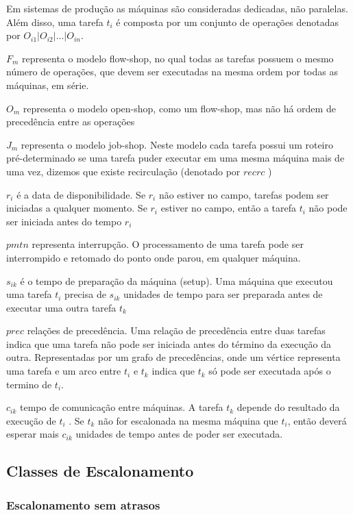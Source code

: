Em sistemas de produção as máquinas são consideradas dedicadas, não paralelas. Além disso, uma tarefa $t_i$ é composta por um conjunto de operações denotadas por $O_{i1} | O_{i2} | ... | O_{in}$.

$F_m$ representa o modelo flow-shop, no qual todas as tarefas possuem o mesmo
número de operações, que devem ser executadas na mesma ordem por todas as máquinas, em série.

$O_m$ representa o modelo open-shop, como um flow-shop, mas não há ordem
de precedência entre as operações

$J_m$  representa o modelo  job-shop. Neste modelo cada tarefa possui um roteiro pré-determinado se uma tarefa puder executar em uma mesma máquina mais de uma vez, dizemos que existe recirculação (denotado por $recrc$ ) 

$r_i$ é a data de disponibilidade. Se $r_i$ não estiver no campo, tarefas podem ser iniciadas a qualquer momento. Se $r_i$ estiver no campo, então a tarefa $t_i$ não pode ser iniciada antes do tempo $r_i$ 

$pmtn$ representa interrupção. O processamento de uma tarefa pode ser interrompido e retomado do ponto onde parou, em qualquer máquina.

$s_{ik}$ é o tempo de preparação da máquina (setup). Uma máquina que executou uma tarefa $t_i$ precisa de $s_{ik}$ unidades de tempo para ser preparada antes de executar uma outra tarefa $t_k$

$prec$ relações de precedência. Uma relação de precedência entre duas tarefas indica
que uma tarefa não pode ser iniciada antes do término da execução da outra. Representadas por um grafo de precedências, onde um vértice representa uma tarefa e um arco entre $t_i$ e $t_k$ indica que $t_k$ só pode ser executada após o termino de $t_i$.

$c_{ik}$ tempo de comunicação entre máquinas. A tarefa $t_k$ depende do resultado da execução de $t_i$ . Se $t_k$ não for escalonada na mesma máquina que $t_i$, então deverá esperar mais $c_{ik}$ unidades de tempo antes de poder ser executada.


\subsection{Classes de Escalonamento}

\subsubsection{Escalonamento sem atrasos}

